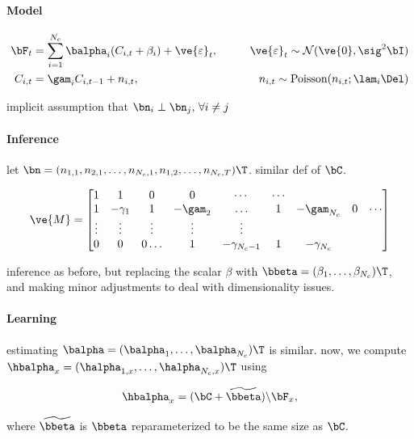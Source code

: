 \paragraph{Model}

\begin{align}
\bF_t &= \sum_{i=1}^{N_c}\balpha_i (C_{i,t} + \beta_i) +  \ve{\varepsilon}_t, \qquad &\ve{\varepsilon}_t \sim \mathcal{N}(\ve{0},\sig^2 \bI)   \\
C_{i,t} &= \gam_i C_{i,t-1} + n_{i,t}, & n_{i,t} \sim \text{Poisson}(n_{i,t}; \lam_i \Del)
\end{align}

implicit assumption that $\bn_i \perp \bn_j, \, \forall i\neq j$

\paragraph{Inference}

let $\bn=(n_{1,1}, n_{2,1}, \ldots, n_{N_c,1}, n_{1,2}, \ldots, n_{N_c,T})\T$. 
similar def of $\bC$.

\begin{align} \label{eq:M2}
\ve{M} = %
\begin{bmatrix}
1 & 1 & 0 & 0 & \cdots & \cdots \\
1 & -\gamma_1 & 1 & -\gam_2 & \ldots & 1 & -\gam_{N_c}  & 0 & \cdots \\
\vdots & \vdots & \vdots & \vdots & \vdots  \\
0 & 0 & 0 \ldots & 1 & -\gamma_{N_c-1} & 1 & -\gamma_{N_c}
\end{bmatrix}
\end{align} 

inference as before, but replacing the scalar $\beta$ with $\bbeta=(\beta_1, \ldots, \beta_{N_c})\T$, and making minor adjustments to deal with dimensionality issues.

\paragraph{Learning}

estimating $\balpha=(\balpha_1,\ldots,\balpha_{N_c})\T$ is similar.  now, we compute $\hbalpha_x=(\halpha_{1,x}, \ldots, \halpha_{N_c,x})\T$ using

\begin{align}
\hbalpha_x = (\bC + \widetilde{\bbeta})\backslash \bF_x,
\end{align}

\noindent where $\widetilde{\bbeta}$ is $\bbeta$ reparameterized to be the same size as $\bC$.

